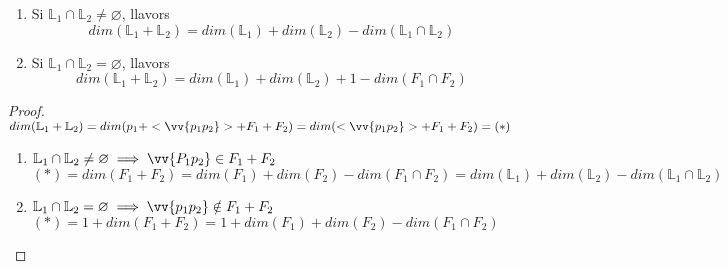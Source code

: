 \begin{thm}\begin{enumerate}[label=\emph{\alph*})]
	\item Si $\mathbb{L}_1\cap\mathbb{L}_2\neq\varnothing$, llavors 
	\[dim(\mathbb{L}_1+\mathbb{L}_2)=dim(\mathbb{L}_1)+dim(\mathbb{L}_2)-dim(\mathbb{L}_1\cap\mathbb{L}_2)\]
	\item Si $\mathbb{L}_1\cap\mathbb{L}_2=\varnothing$, llavors
	\[dim(\mathbb{L}_1+\mathbb{L}_2)=dim(\mathbb{L}_1)+dim(\mathbb{L}_2)+1-dim(F_1\cap F_2)\]
\end{enumerate}\end{thm}
\begin{proof}
	$dim(\mathbb{L}_1+\mathbb{L}_2)=dim(p_1+<\vv{p_1p_2}>+F_1+F_2)=dim(<\vv{p_1p_2}>+F_1+F_2)=(\ast )$ \\
	\begin{enumerate}[label=\emph{\alph*})]
	\item $\mathbb{L}_1\cap\mathbb{L}_2\neq\varnothing\implies\vv{P_1p_2}\in F_1+F_2$ \\
	$(\ast )=dim(F_1+F_2)=dim(F_1)+dim(F_2)-dim(F_1\cap F_2)=dim(\mathbb{L}_1)+dim(\mathbb{L}_2)-dim(\mathbb{L}_1\cap\mathbb{L}_2)$
	\item $\mathbb{L}_1\cap\mathbb{L}_2=\varnothing\implies\vv{p_1p_2}\notin F_1+F_2$ \\
	$(\ast )=1+dim(F_1+F_2)=1+dim(F_1)+dim(F_2)-dim(F_1\cap F_2)$
\end{enumerate}\end{proof}

